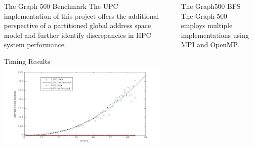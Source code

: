 \documentclass[final]{beamer}
\newlength{\sepwid}
\newlength{\onecolwid}
\newlength{\twocolwid}
\begin{document}
\begin{frame}[t]
\begin{columns}[t]
\begin{column}{\twocolwid}
\begin{block}{The Graph 500 Benchmark}
					The UPC implementation of this project offers the additional perspective of a partitioned global address space model and further identify discrepancies in HPC system performance.
				\end{block}
				\begin{block}{Timing Results}
					\includegraphics[width=\twocolwid, keepaspectratio]{DotProduct.pdf}\\
				\end{block}						
			\end{column}	
			\begin{column}{\sepwid}\end{column}			%
			\begin{column}{\onecolwid}
				\begin{block}{The Graph500 BFS}
					The Graph 500 employs multiple implementations using MPI and OpenMP.  
					

\end{block}
\end{column}
\end{columns}
\end{frame}
\end{document}
